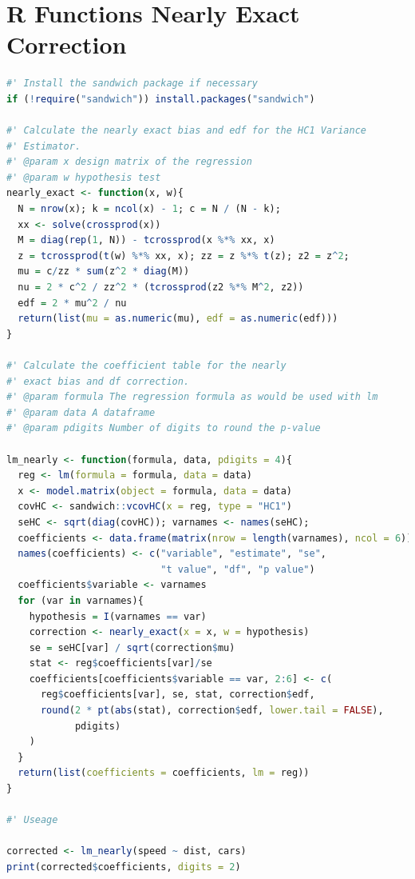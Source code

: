 \documentclass[12pt]{article}
\begin{document}
\section{R Functions Nearly Exact Correction} \label{appendix-R}
\begin{lstlisting}[language=R]
#' Install the sandwich package if necessary
if (!require("sandwich")) install.packages("sandwich")

#' Calculate the nearly exact bias and edf for the HC1 Variance
#' Estimator.
#' @param x design matrix of the regression
#' @param w hypothesis test
nearly_exact <- function(x, w){
  N = nrow(x); k = ncol(x) - 1; c = N / (N - k);
  xx <- solve(crossprod(x))
  M = diag(rep(1, N)) - tcrossprod(x %*% xx, x)
  z = tcrossprod(t(w) %*% xx, x); zz = z %*% t(z); z2 = z^2;
  mu = c/zz * sum(z^2 * diag(M))
  nu = 2 * c^2 / zz^2 * (tcrossprod(z2 %*% M^2, z2))
  edf = 2 * mu^2 / nu
  return(list(mu = as.numeric(mu), edf = as.numeric(edf)))
}

#' Calculate the coefficient table for the nearly
#' exact bias and df correction.
#' @param formula The regression formula as would be used with lm
#' @param data A dataframe
#' @param pdigits Number of digits to round the p-value

lm_nearly <- function(formula, data, pdigits = 4){
  reg <- lm(formula = formula, data = data)
  x <- model.matrix(object = formula, data = data)
  covHC <- sandwich::vcovHC(x = reg, type = "HC1")
  seHC <- sqrt(diag(covHC)); varnames <- names(seHC); 
  coefficients <- data.frame(matrix(nrow = length(varnames), ncol = 6))
  names(coefficients) <- c("variable", "estimate", "se",
                           "t value", "df", "p value")
  coefficients$variable <- varnames
  for (var in varnames){
    hypothesis = I(varnames == var)
    correction <- nearly_exact(x = x, w = hypothesis)
    se = seHC[var] / sqrt(correction$mu)
    stat <- reg$coefficients[var]/se
    coefficients[coefficients$variable == var, 2:6] <- c(
      reg$coefficients[var], se, stat, correction$edf, 
      round(2 * pt(abs(stat), correction$edf, lower.tail = FALSE),
            pdigits)
    )
  }
  return(list(coefficients = coefficients, lm = reg))
}

#' Useage

corrected <- lm_nearly(speed ~ dist, cars)
print(corrected$coefficients, digits = 2)
\end{lstlisting}
\end{document}
